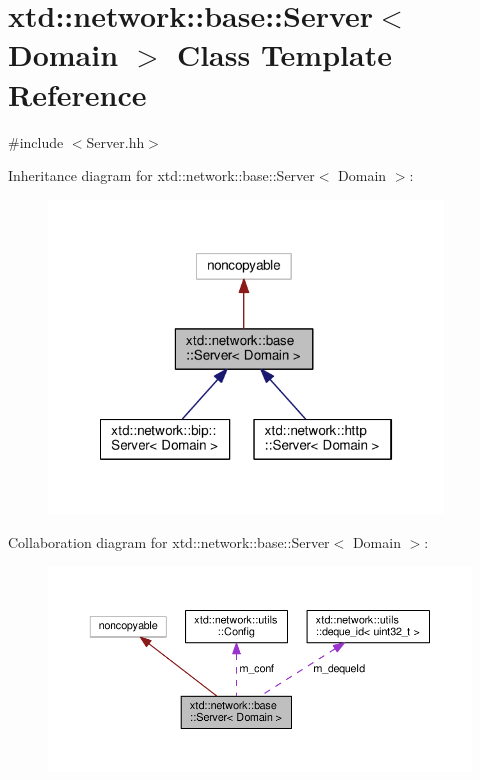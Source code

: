 \hypertarget{classxtd_1_1network_1_1base_1_1Server}{\section{xtd\-:\-:network\-:\-:base\-:\-:Server$<$ Domain $>$ Class Template Reference}
\label{classxtd_1_1network_1_1base_1_1Server}
}


{\ttfamily \#include $<$Server.\-hh$>$}



Inheritance diagram for xtd\-:\-:network\-:\-:base\-:\-:Server$<$ Domain $>$\-:
\nopagebreak
\begin{figure}[H]
\begin{center}
\leavevmode
\includegraphics[width=297pt]{classxtd_1_1network_1_1base_1_1Server__inherit__graph}
\end{center}
\end{figure}


Collaboration diagram for xtd\-:\-:network\-:\-:base\-:\-:Server$<$ Domain $>$\-:
\nopagebreak
\begin{figure}[H]
\begin{center}
\leavevmode
\includegraphics[width=350pt]{classxtd_1_1network_1_1base_1_1Server__coll__graph}
\end{center}
\end{figure}
